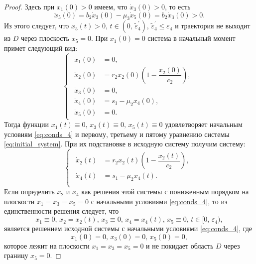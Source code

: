 \documentclass[14pt,a4paper]{extarticle}
\begin{document}
\begin{proof}
		Здесь при $x_1(0)>0$ имеем, что $\dot{x}_3(0)>0$, то есть
		\[\ddot{x}_5(0)=b_2\dot{x}_3(0)-\mu_3\dot{x}_5(0)=b_2\dot{x}_3(0)>0.\] 
		Из этого следует, что $x_5(t)>0,\, t\in(0,\, \tilde{\varepsilon}^\prime_4),\,\tilde{\varepsilon}^\prime_4\le\varepsilon_4$ и траектория не выходит из $D$ через плоскость $x_5=0$. При $x_1(0)=0$ система в начальный момент примет следующий вид:
		\begin{equation*}
			\begin{cases}
				\begin{aligned}
					\dot{x}_1(0) &= 0,\\
					\dot{x}_2(0) &= r_2x_2(0)\left(1-\dfrac{x_2(0)}{c_2}\right),\\
					\dot{x}_3(0) &= 0,\\ 
					\dot{x}_4(0) &= s_1-\mu_2x_4(0),\\
					\dot{x}_5(0) &= 0.
				\end{aligned}
			\end{cases}
		\end{equation*}
		Тогда функции $x_1(t)\equiv0,\, x_3(t)\equiv0,\, x_5(t)\equiv0$ удовлетворяет начальным условиям \ref{eq:conds_4} и первому, третьему и пятому уравнению системы \ref{eq:initial_system}. При их подстановке в исходную систему получим систему:
		\begin{equation*}
			\begin{cases}
				\begin{aligned}
					\dot{x}_2(t) &= r_2x_2(t)\left(1-\dfrac{x_2(t)}{c_2}\right),\\
					\dot{x}_4(t) &= s_1-\mu_2x_4(t).\\
				\end{aligned}
			\end{cases}
		\end{equation*}
		Если определить $x_2$ и $x_4$ как решения этой системы с пониженным порядком на плоскости $x_1=x_3=x_5=0$ с начальными условиями \ref{eq:conds_4}, то из единственности решения следует, что
		\[x_1\equiv0,\, x_2=x_2(t),\, x_3\equiv0,\, x_4=x_4(t),\, x_5\equiv0,\, t\in[0,\,\varepsilon_4),\]
		является решением исходной системы с начальными условиями \ref{eq:conds_4}, где
		\[x_1(0)=0,\, x_3(0)=0,\, x_5(0)=0,\]
		которое лежит на плоскости $x_1=x_3=x_5=0$ и не покидает область $D$ через границу $x_5=0$.
		

\end{proof}
\end{document}
